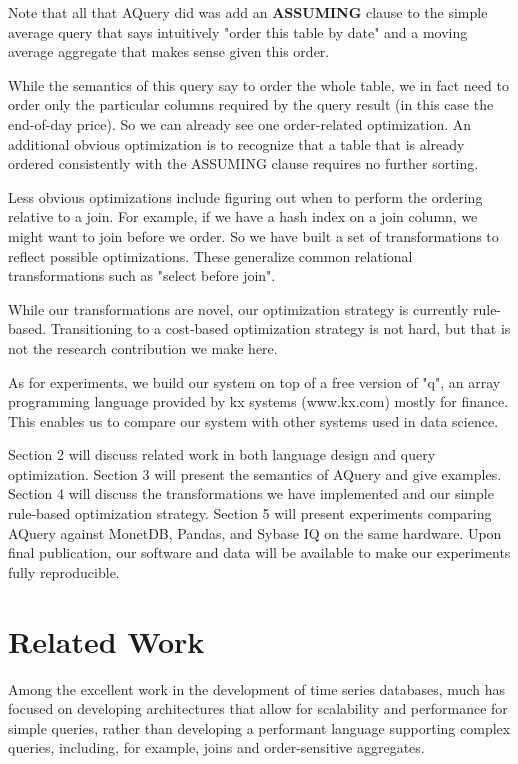 \documentclass{acm_proc_article-sp}
\begin{document}
Note that all that AQuery did was 
add an \textbf{ASSUMING} clause to the simple
average query that says intuitively
"order this table by date"
and a moving average aggregate that makes sense given this order.

While the semantics of this query say to order the whole table,
we in fact need to order only the particular columns
required by the query result (in this case the end-of-day price).
So we can already see one order-related optimization.
An additional obvious optimization 
is to recognize that a table that is already ordered consistently 
with the ASSUMING clause
requires no further sorting.

Less obvious optimizations include figuring out when to perform
the ordering relative to a join.
For example, if we have a hash index on a join column, we might want to join
before we order.
So we have built a set of transformations to reflect possible optimizations.
These generalize common relational 
transformations such as "select before join".


While our transformations are novel, our optimization strategy is currently
rule-based.  Transitioning to a cost-based optimization strategy is 
not hard, but that is not the research contribution we make here.

As for experiments, we build our system on top of a free version of "q",
an array programming language provided by kx systems 
(www.kx.com) mostly for finance.
This enables us to compare our system with other systems used
in data science.

Section 2 will discuss related work in both language design and query
optimization. 
Section 3 will present the semantics of AQuery and give examples.
Section 4 will discuss the transformations we have implemented
and our simple rule-based optimization strategy.
Section 5 will present experiments comparing AQuery against MonetDB,
Pandas, and Sybase IQ on the same hardware.
Upon final publication, our software and data will be available 
to make our experiments fully reproducible.


\section{Related Work}

Among the excellent work in the development of time series databases,
much has focused on developing architectures
that allow for scalability and performance for simple queries, rather 
than developing a performant language supporting complex queries, including,
for example, joins and 
order-sensitive aggregates. 
\end{document}

